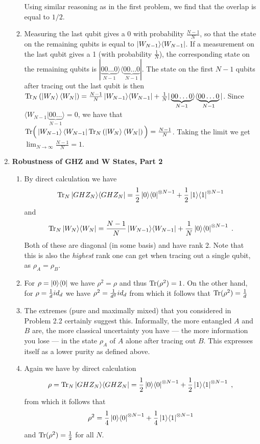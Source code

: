 \documentclass[12pt]{article}
\begin{document}
\begin{enumerate}
\begin{enumerate}
	Using similar reasoning as in the first problem, we find that the overlap is equal to $1/2$.
\item	
	Measuring the last qubit gives a $0$ with probability $\frac{N-1}{N}$, so that the state on the remaining qubits is equal to $\ket{W_{N-1}}\!\bra{W_{N-1}}$. If a measurement on the last qubit gives a 1 (with probability $\frac{1}{N}$), the corresponding state on the remaining qubits is $|\underbrace{00\ldots0}_{N-1}\rangle \langle\underbrace{00\ldots0}_{N-1} |$. The state on the first $N-1$ qubits after tracing out the last qubit is then $\mathrm{Tr}_N\left(\left| W_N \right\rangle \left\langle W_N \right|\right) = \frac{N-1}{N}\ket{W_{N-1}}\!\bra{W_{N-1}}+\frac{1}{N}|\underbrace{00\ldots0}_{N-1}\rangle \langle \underbrace{00\ldots0}_{N-1}|$.
	Since $\langle W_{N-1}|\underbrace{00\ldots}_{N-1}\rangle = 0$, we have that $\mathrm{Tr}\Big(\left| W_{N-1} \right\rangle \left\langle W_{N-1} \right| \mathrm{Tr}_N\left(\left| W_N \right\rangle \left\langle W_N \right|\right)\Big) = \frac{N-1}{N}$. Taking the limit we get $\lim_{N\rightarrow\infty}\frac{N-1}{N} = 1$.
\end{enumerate}
\item {\bf Robustness of GHZ and W States, Part 2}

\begin{enumerate}
	\item By direct calculation we have $$\mathrm{Tr}_N \ket{GHZ_N}\!\bra{GHZ_N} = \frac{1}{2}\ket{0}\!\bra{0}^{\otimes {N-1}}+\frac{1}{2}\ket{1}\!\bra{1}^{\otimes {N-1}}$$ and $$\mathrm{Tr}_ N \ket{W_N}\!\bra{W_N} = \frac{N-1}{N}\ket{W_{N-1}}\!\bra{W_{N-1}}+\frac{1}{N}\ket{0}\!\bra{0}^{\otimes {N-1}}\;.$$ Both of these are diagonal (in some basis) and have rank 2. Note that this is also the \emph{highest} rank one can get when tracing out a single qubit, as $\rho_A=\rho_B$.
	
	\item For $\rho =\ket{0}\!\bra{0}$ we have $\rho^2=\rho$ and thus $\mathrm{Tr}(\rho^2)=1$. On the other hand, for $\rho =\frac{1}{d} id_d$ we have $\rho^2=\frac{1}{d^2} id_ d$ from which it follows that $\mathrm{Tr}(\rho^2)=\frac{1}{d}$
	
	\item The extremes (pure and maximally mixed) that you considered in Problem 2.2 certainly suggest this. Informally, the more entangled $A$ and $B$ are, the more classical uncertainty you have --- the more information you lose --- in the state $\rho _ A$ of $A$ alone after tracing out $B$. This expresses itself as a lower purity as defined above.
	
	\item Again we have by direct calculation $$\rho = \mathrm{Tr}_ N \ket{GHZ_N}\!\bra{GHZ_N} = \frac{1}{2}\ket{0}\!\bra{0}^{\otimes {N-1}}+\frac{1}{2}\ket{1}\!\bra{1}^{\otimes {N-1}}\;,$$ from which it follows that $$\rho^2 = \frac{1}{4}\ket{0}\!\bra{0}^{\otimes {N-1}}+\frac{1}{4}\ket{1}\!\bra{1}^{\otimes {N-1}}$$ and $\mathrm{Tr}(\rho^2)=\frac{1}{2}$ for all $N$.
	

\end{enumerate}
\end{enumerate}
\end{document}
